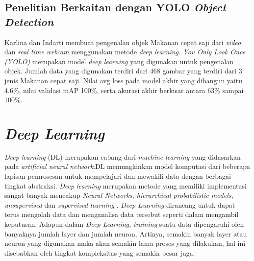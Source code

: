 \subsection{Penelitian Berkaitan dengan YOLO \textit{Object Detection}}
\label{subsec:penelitianterkaityolo}
Karlina dan Indarti \citep*{karlina2020pengenalan} membuat pengenalan objek Makanan cepat saji dari \textit{video} dan \textit{real time webcam} menggunakan metode \textit{deep learning. You Only Look Once (YOLO)} merupakan model \textit{deep learning} yang digunakan untuk pengenalan objek. Jumlah data yang digunakan terdiri dari 468 gambar yang terdiri dari 3 jenis Makanan cepat saji. Nilai avg loss pada model akhir yang dibangun yaitu 4.6\%, nilai validasi mAP 100\%, serta akurasi akhir berkisar antara 63\% sampai 100\%. \par








\section{\textit{Deep Learning}}
\label{sec:deeplearning}
\textit{Deep learning} (DL) merupakan cabang dari \textit{machine learning} yang didasarkan pada \textit{artificial neural network}.DL memungkinkan model komputasi dari beberapa lapisan pemrosesan untuk mempelajari dan mewakili data dengan berbagai tingkat abstraksi. \textit{Deep learning} merupakan metode yang memiliki implementasi sangat banyak mencakup \textit{Neural Networks, hierarchical probabilistic models, unsupervised} dan \textit{supervised learning} \citep*{voulodimos2018deep}. \textit{Deep Learning} dirancang untuk dapat terus mengolah data dan menganalisa data tersebut seperti dalam mengambil keputusan. Adapun dalam \textit{Deep Learning, training} suatu data dipengaruhi oleh banyaknya jumlah layer dan jumlah neuron. Artinya, semakin banyak layer atau neuron yang digunakan maka akan semakin lama proses yang dilakukan, hal ini disebabkan oleh tingkat kompleksitas yang semakin besar juga. \par

